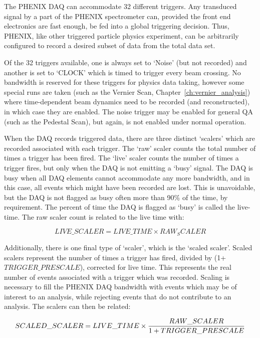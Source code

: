 The PHENIX DAQ can accommodate 32 different triggers. Any transduced signal by a
part of the PHENIX spectrometer can, provided the front end electronics are
fast enough, be fed into a global triggering decision. Thus, PHENIX, like other
triggered particle physics experiment, can be arbitrarily configured to record a
desired subset of data from the total data set.

Of the 32 triggers available, one is always set to `Noise' (but not recorded)
and another is set to `CLOCK' which is timed to trigger every beam crossing. No
bandwidth is reserved for these triggers for physics data taking, however some
special runs are taken (such as the Vernier Scan,
Chapter~\ref{ch:vernier_analysis}) where time-dependent beam dynamics need to be
recorded (and reconstructed), in which case they are enabled. The noise trigger
may be enabled for general QA (such as the Pedestal Scan), but again, is not
enabled under normal operation.  

When the DAQ records triggered data, there are three distinct `scalers' which
are recorded associated with each trigger. The `raw' scaler counts the total
number of times a trigger has been fired. The `live' scaler counts the number of
times a trigger fires, but only when the DAQ is not emitting a `busy' signal.
The DAQ is busy when all DAQ elements cannot accommodate any more bandwidth, and
in this case, all events which might have been recorded are lost. This is
unavoidable, but the DAQ is not flagged as busy often more than 90\% of the
time, by requirement. The percent of time the DAQ is flagged as `busy' is called
the live-time. The raw scaler count is related to the live time with:

\begin{equation}
LIVE\_SCALER = LIVE\_TIME \times RAW_SCALER
\end{equation}

Additionally, there is one final type of `scaler', which is the `scaled scaler'.
Scaled scalers represent the number of times a trigger has fired, divided by
(1+$TRIGGER\_PRESCALE$), corrected for live time. This represents the real
number of events associated with a trigger which was recorded. Scaling is
necessary to fill the PHENIX DAQ bandwidth with events which may be of interest
to an analysis, while rejecting events that do not contribute to an analysis.
The scalers can then be related:

\begin{equation}
  SCALED\_SCALER = LIVE\_TIME \times {{RAW\_SCALER}\over{1+TRIGGER\_PRESCALE}}
\end{equation}


